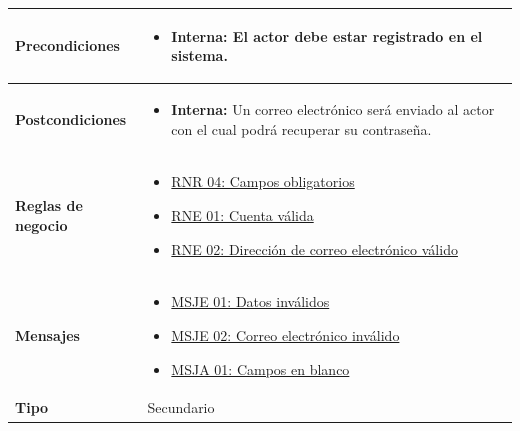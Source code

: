 \begin{center}
\begin{longtable}{| p{3.5cm} | p{11.5cm} |}
        \hline	
          \textbf{Precondiciones}& 
            \begin{itemize}
              \item \textbf{Interna:} El actor debe estar registrado en el sistema.
            \end{itemize} \\
        \hline	
          \textbf{Postcondiciones} & 
            \begin{itemize}
              \item \textbf{Interna:} Un correo electrónico será enviado al actor con el cual podrá recuperar su contraseña.
            \end{itemize} \\
       \hline    
          \textbf{Reglas de negocio} & 
          \begin{itemize}
         	  \item {\hyperref[rnr_04]{RNR 04: Campos obligatorios}}
         	  \item {\hyperref[rnr_01]{RNE 01: Cuenta válida}}
         	  \item {\hyperref[rnr_02]{RNE 02: Dirección de correo electrónico válido}}
	 \end{itemize} \\
       \hline
          \textbf{Mensajes} & 
         	\begin{itemize}
         	  \item {\hyperref[msje_01]{MSJE 01: Datos inválidos}}
         	  \item {\hyperref[msje_02]{MSJE 02: Correo electrónico inválido}}
         	  \item {\hyperref[msja_01]{MSJA 01: Campos en blanco}}
	 \end{itemize} \\
       \hline
          \textbf{Tipo} & Secundario \\
       \hline	    
  \end{longtable}
\end{center}
\endgroup

